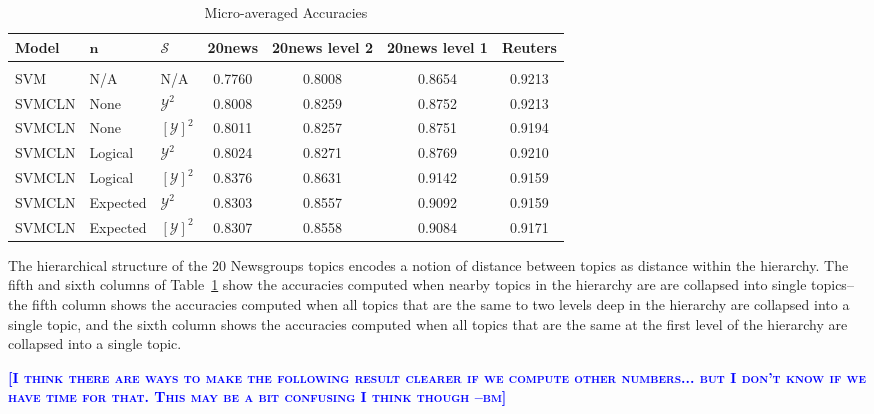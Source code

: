 \documentclass{article} %
\newcommand{\bmcomment}[1]{\textcolor{blue}{\textsc{\textbf{[#1 --bm]}}}}
\begin{document}
\begin{table}[t]
\caption{Micro-averaged Accuracies}
\label{accuraciesTable}
\begin{center}
\begin{tabular}{lllcccc}
\bf{Model}  & \bf{$\mathbf{n}$} & \bf{$\mathcal{S}$} & \bf{20news} & \bf{20news level 2}   & \bf{20news level 1}   & \bf{Reuters}
\\ \hline \\
SVM         & N/A               & N/A                & 0.7760      & 0.8008                & 0.8654                & 0.9213 \\
SVMCLN      & None              & $\mathcal{Y}^2$    & 0.8008      & 0.8259                & 0.8752                & 0.9213 \\ 
SVMCLN      & None              & $[\mathcal{Y}]^2$  & 0.8011      & 0.8257                & 0.8751                & 0.9194 \\
SVMCLN      & Logical           & $\mathcal{Y}^2$    & 0.8024      & 0.8271                & 0.8769                & 0.9210 \\ 
SVMCLN      & Logical           & $[\mathcal{Y}]^2$  & 0.8376      & 0.8631                & 0.9142                & 0.9159 \\
SVMCLN      & Expected          & $\mathcal{Y}^2$    & 0.8303      & 0.8557                & 0.9092                & 0.9159 \\ 
SVMCLN      & Expected          & $[\mathcal{Y}]^2$  & 0.8307      & 0.8558                & 0.9084                & 0.9171 \\
\end{tabular}
\end{center}
\end{table}

The hierarchical structure of the 20 Newsgroups topics encodes a notion
of distance between topics as distance within the hierarchy.  The fifth
and sixth columns of Table~\ref{accuraciesTable} show the accuracies 
computed when nearby topics in the hierarchy are are collapsed into
single topics--the fifth column shows the accuracies computed when all
topics that are the same to two levels deep in the hierarchy are collapsed
into a single topic, and the sixth column shows the accuracies computed
when all topics that are the same at the first level of the hierarchy are
collapsed into a single topic.  

\bmcomment{I think there are ways to make the following result clearer
if we compute other numbers... but I don't know if we have time for that.
This may be a bit confusing I think though}
\end{document}
